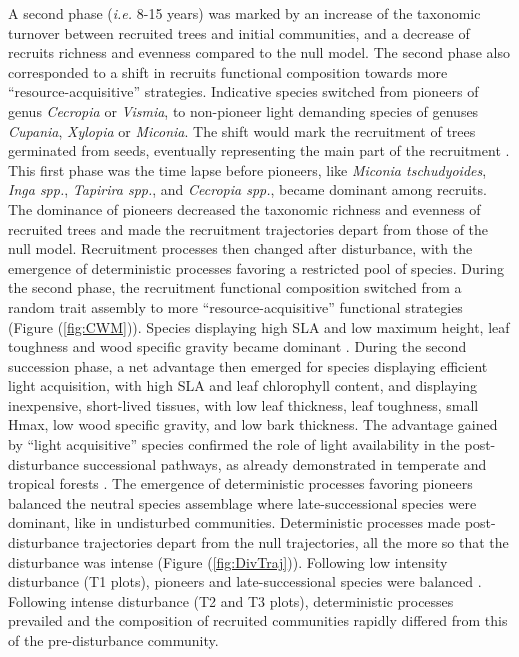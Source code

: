 \documentclass[fleqn,10pt]{ArtEcoFoG} %
\begin{document}
A second phase (\emph{i.e.} 8-15 years) was marked by an increase of the taxonomic turnover between recruited trees and initial communities, and a decrease of recruits richness and evenness compared to the null model.
The second phase also corresponded to a shift in recruits functional composition towards more ``resource-acquisitive'' strategies.
Indicative species switched from pioneers of genus \emph{Cecropia} or \emph{Vismia}, to non-pioneer light demanding species of genuses \emph{Cupania}, \emph{Xylopia} or \emph{Miconia}.
The shift would mark the recruitment of trees germinated from seeds, eventually representing the main part of the recruitment \citep{Lawton1988}.
This first phase was the time lapse before pioneers, like \emph{Miconia tschudyoides}, \emph{Inga spp.}, \emph{Tapirira spp.}, and \emph{Cecropia spp.}, became dominant among recruits.
The dominance of pioneers decreased the taxonomic richness and evenness of recruited trees and made the recruitment trajectories depart from those of the null model.
Recruitment processes then changed after disturbance, with the emergence of deterministic processes favoring a restricted pool of species.
During the second phase, the recruitment functional composition switched from a random trait assembly to more ``resource-acquisitive'' functional strategies (Figure (\ref{fig:CWM})).
Species displaying high SLA and low maximum height, leaf toughness and wood specific gravity became dominant \citep{Wright2004, Chave2009b, Herault2011}.
During the second succession phase, a net advantage then emerged for species displaying efficient light acquisition, with high SLA and leaf chlorophyll content, and displaying inexpensive, short-lived tissues, with low leaf thickness, leaf toughness, small Hmax, low wood specific gravity, and low bark thickness.
The advantage gained by ``light acquisitive'' species confirmed the role of light availability in the post-disturbance successional pathways, as already demonstrated in temperate and tropical forests \citep{Pena2008, Carreno2012, Kunstler2016, Both2019}.
The emergence of deterministic processes favoring pioneers balanced the neutral species assemblage where late-successional species were dominant, like in undisturbed communities.
Deterministic processes made post-disturbance trajectories depart from the null trajectories, all the more so that the disturbance was intense (Figure (\ref{fig:DivTraj})).
Following low intensity disturbance (T1 plots), pioneers and late-successional species were balanced \citep{Bongers2009}.
Following intense disturbance (T2 and T3 plots), deterministic processes prevailed and the composition of recruited communities rapidly differed from this of the pre-disturbance community.
\end{document}
